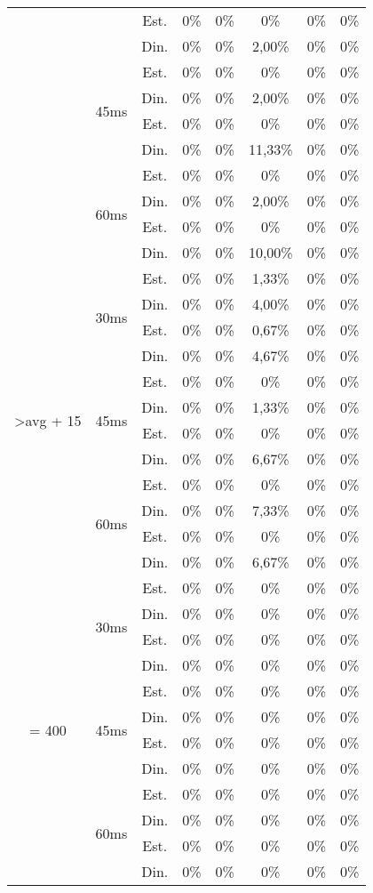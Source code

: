 \begin{center}
\begin{longtable}{|c|c|c|ccccc|}
 &  & Est. & 0\% & 0\% & 0\% & 0\% & 0\% \\
 &  & Din. & 0\% & 0\% & 2,00\% & 0\% & 0\% \\ \cline{2-8} 
 & \multirow{4}{*}{45ms} & Est. & 0\% & 0\% & 0\% & 0\% & 0\% \\
 &  & Din. & 0\% & 0\% & 2,00\% & 0\% & 0\% \\
 &  & Est. & 0\% & 0\% & 0\% & 0\% & 0\% \\
 &  & Din. & 0\% & 0\% & 11,33\% & 0\% & 0\% \\ \cline{2-8} 
 & \multirow{4}{*}{60ms} & Est. & 0\% & 0\% & 0\% & 0\% & 0\% \\
 &  & Din. & 0\% & 0\% & 2,00\% & 0\% & 0\% \\
 &  & Est. & 0\% & 0\% & 0\% & 0\% & 0\% \\
 &  & Din. & 0\% & 0\% & 10,00\% & 0\% & 0\% \\ \hline
\multirow{12}{*}{\textgreater avg + 15} & \multirow{4}{*}{30ms} & Est. & 0\% & 0\% & 1,33\% & 0\% & 0\% \\
 &  & Din. & 0\% & 0\% & 4,00\% & 0\% & 0\% \\
 &  & Est. & 0\% & 0\% & 0,67\% & 0\% & 0\% \\
 &  & Din. & 0\% & 0\% & 4,67\% & 0\% & 0\% \\ \cline{2-8} 
 & \multirow{4}{*}{45ms} & Est. & 0\% & 0\% & 0\% & 0\% & 0\% \\
 &  & Din. & 0\% & 0\% & 1,33\% & 0\% & 0\% \\
 &  & Est. & 0\% & 0\% & 0\% & 0\% & 0\% \\
 &  & Din. & 0\% & 0\% & 6,67\% & 0\% & 0\% \\ \cline{2-8} 
 & \multirow{4}{*}{60ms} & Est. & 0\% & 0\% & 0\% & 0\% & 0\% \\
 &  & Din. & 0\% & 0\% & 7,33\% & 0\% & 0\% \\
 &  & Est. & 0\% & 0\% & 0\% & 0\% & 0\% \\
 &  & Din. & 0\% & 0\% & 6,67\% & 0\% & 0\% \\ \hline
\multirow{12}{*}{= 400} & \multirow{4}{*}{30ms} & Est. & 0\% & 0\% & 0\% & 0\% & 0\% \\
 &  & Din. & 0\% & 0\% & 0\% & 0\% & 0\% \\
 &  & Est. & 0\% & 0\% & 0\% & 0\% & 0\% \\
 &  & Din. & 0\% & 0\% & 0\% & 0\% & 0\% \\ \cline{2-8} 
 & \multirow{4}{*}{45ms} & Est. & 0\% & 0\% & 0\% & 0\% & 0\% \\
 &  & Din. & 0\% & 0\% & 0\% & 0\% & 0\% \\
 &  & Est. & 0\% & 0\% & 0\% & 0\% & 0\% \\
 &  & Din. & 0\% & 0\% & 0\% & 0\% & 0\% \\ \cline{2-8} 
 & \multirow{4}{*}{60ms} & Est. & 0\% & 0\% & 0\% & 0\% & 0\% \\
 &  & Din. & 0\% & 0\% & 0\% & 0\% & 0\% \\
 &  & Est. & 0\% & 0\% & 0\% & 0\% & 0\% \\
 &  & Din. & 0\% & 0\% & 0\% & 0\% & 0\% \\ \hline
\end{longtable}
\end{center}
